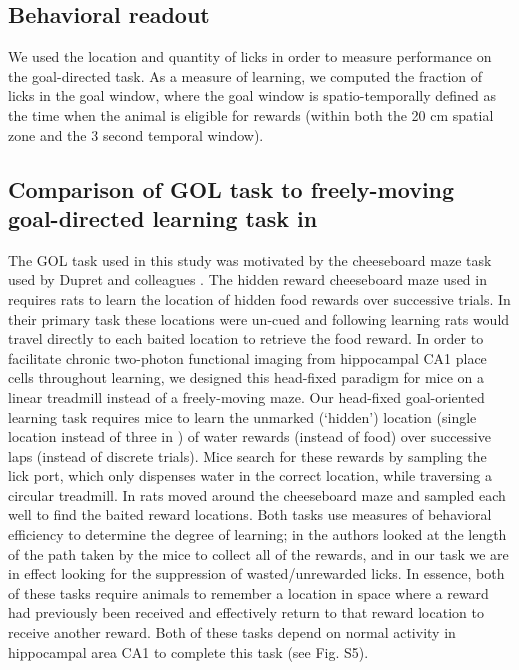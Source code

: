 \subsection{Behavioral readout}
We used the location and quantity of licks in order to measure performance on the goal-directed task. As a measure of learning, we computed the fraction of licks in the goal window, where the goal window is spatio-temporally defined as the time when the animal is eligible for rewards (within both the 20 cm spatial zone and the 3 second temporal window).

\subsection{Comparison of GOL task to freely-moving goal-directed learning task in \citeauthor{Dupret2010a}}\label{sec:methods:comp}
The GOL task used in this study was motivated by the cheeseboard maze task used by Dupret and colleagues \citep{Dupret2010a}. The hidden reward cheeseboard maze used in \citeauthor{Dupret2010a} requires rats to learn the location of hidden food rewards over successive trials. In their primary task these locations were un-cued and following learning rats would travel directly to each baited location to retrieve the food reward. In order to facilitate chronic two-photon functional imaging from hippocampal CA1 place cells throughout learning, we designed this head-fixed paradigm for mice on a linear treadmill instead of a freely-moving maze. Our head-fixed goal-oriented learning task requires mice to learn the unmarked (‘hidden’) location (single location instead of three in \citeauthor{Dupret2010a}) of water rewards (instead of food) over successive laps (instead of discrete trials). Mice search for these rewards by sampling the lick port, which only dispenses water in the correct location, while traversing a circular treadmill. In \citeauthor{Dupret2010a} rats moved around the cheeseboard maze and sampled each well to find the baited reward locations. Both tasks use measures of behavioral efficiency to determine the degree of learning; in \citeauthor{Dupret2010a} the authors looked at the length of the path taken by the mice to collect all of the rewards, and in our task we are in effect looking for the suppression of wasted/unrewarded licks. In essence, both of these tasks require animals to remember a location in space where a reward had previously been received and effectively return to that reward location to receive another reward. Both of these tasks depend on normal activity in hippocampal area CA1 to complete this task (see Fig. S5).

